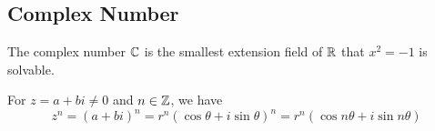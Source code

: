 \subsection{Complex Number}

The complex number $\mathbb{C}$ is the smallest extension field of $\mathbb{R}$ that $x^2 = -1$ is solvable.

\begin{theorem}
    For $z = a + b i \neq 0$ and $n \in \mathbb{Z}$, we have 
    \begin{equation}
        z^n = (a+bi)^n = r^n(\cos \theta + i \sin \theta)^n = r^n (\cos n\theta + i \sin n\theta)
    \end{equation}
\end{theorem}




















































































